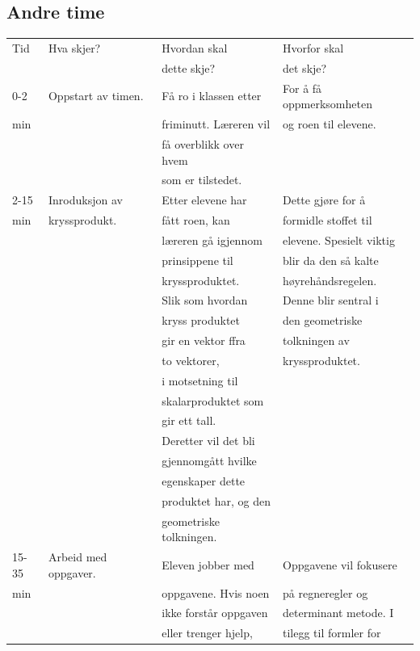 \documentclass[11pt]{article}
\begin{document}
\subsection*{Andre time}
\label{sec-2-2}
\begin{center}
\begin{tabular}{l|l|l|l}
Tid & Hva skjer? & Hvordan skal & Hvorfor skal\\
 &  & dette skje? & det skje?\\
\hline
0-2 & Oppstart av timen. & Få ro i klassen etter & For å få oppmerksomheten\\
min &  & friminutt. Læreren vil & og roen til elevene.\\
 &  & få overblikk over hvem & \\
 &  & som er tilstedet. & \\
\hline
2-15 & Inroduksjon av & Etter elevene har & Dette gjøre for å\\
min & kryssprodukt. & fått roen, kan & formidle stoffet til\\
 &  & læreren gå igjennom & elevene. Spesielt viktig\\
 &  & prinsippene til & blir da den så kalte\\
 &  & kryssproduktet. & høyrehåndsregelen.\\
 &  & Slik som hvordan & Denne blir sentral i\\
 &  & kryss produktet & den geometriske\\
 &  & gir en vektor ffra & tolkningen av\\
 &  & to vektorer, & kryssproduktet.\\
 &  & i motsetning til & \\
 &  & skalarproduktet som & \\
 &  & gir ett tall. & \\
 &  & Deretter vil det bli & \\
 &  & gjennomgått hvilke & \\
 &  & egenskaper dette & \\
 &  & produktet har, og den & \\
 &  & geometriske tolkningen. & \\
\hline
15-35 & Arbeid med oppgaver. & Eleven jobber med & Oppgavene vil fokusere\\
min &  & oppgavene. Hvis noen & på regneregler og\\
 &  & ikke forstår oppgaven & determinant metode. I\\
 &  & eller trenger hjelp, & tilegg til formler for\\

\end{tabular}
\end{center}
\end{document}
